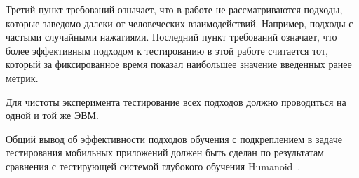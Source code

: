 Третий пункт требований означает, что в работе не рассматриваются подходы, которые заведомо далеки от человеческих взаимодействий. Например, подходы с частыми случайными нажатиями. Последний пункт требований означает, что более эффективным подходом к тестированию в этой работе считается тот, который за фиксированное время показал наибольшее значение введенных ранее метрик.

Для чистоты эксперимента тестирование всех подходов должно проводиться на одной и той же ЭВМ.

Общий вывод об эффективности подходов обучения с подкреплением в задаче тестирования мобильных приложений должен быть сделан по результатам сравнения с тестирующей системой глубокого обучения Humanoid~\cite{li2019deep}.

